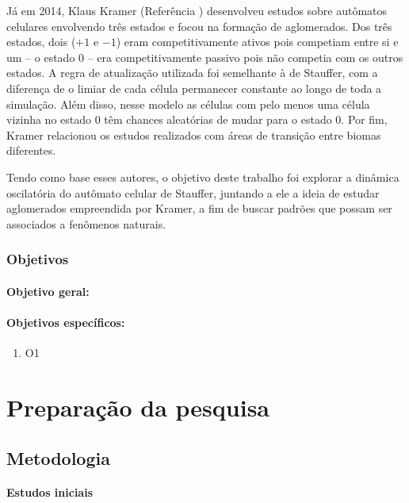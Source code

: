 \documentclass[
	12pt,				%
	openright,			%
	twoside,			%
	a4paper,			%
	english,			%
	french,				%
	spanish,			%
	brazil				%
	]{abntex2}
\begin{document}
Já em 2014, Klaus Kramer (Referência \cite{klaus}) desenvolveu estudos sobre autômatos celulares envolvendo três estados e focou na formação de aglomerados. Dos três estados, dois ($+1$ e $-1$) eram competitivamente ativos pois competiam entre si e um -- o estado $0$ -- era competitivamente passivo pois não competia com os outros estados. A regra de atualização utilizada foi semelhante à de Stauffer, com a diferença de o limiar de cada célula permanecer constante ao longo de toda a simulação. Além disso, nesse modelo as células com pelo menos uma célula vizinha no estado $0$ têm chances aleatórias de mudar para o estado $0$. Por fim, Kramer relacionou os estudos realizados com áreas de transição entre biomas diferentes.

Tendo como base esses autores, o objetivo deste trabalho foi explorar a dinâmica oscilatória do autômato celular de Stauffer, juntando a ele a ideia de estudar aglomerados empreendida por Kramer, a fim de buscar padrões que possam ser associados a fenômenos naturais.

\section*{Objetivos}

\subsection*{Objetivo geral:}

\subsection*{Objetivos específicos:}
\begin{enumerate}
  \item O1
\end{enumerate}

\part{Preparação da pesquisa}

\chapter{Metodologia}

\subsection*{Estudos iniciais}
\end{document}

